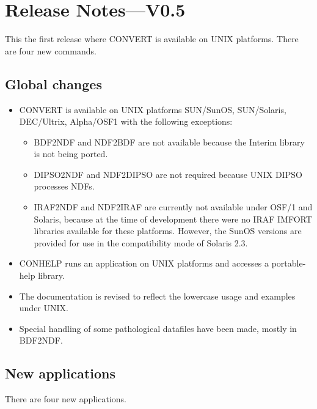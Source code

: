 \section{Release Notes---V0.5}

This the first release where {\footnotesize CONVERT} is available on
UNIX platforms.  There are four new commands. 

\subsection{Global changes}
\begin{itemize}
  \item  {\footnotesize CONVERT} is available on UNIX platforms
         SUN/SunOS, SUN/Solaris, DEC/Ultrix, Alpha/OSF1 with the
         following exceptions:

  \begin{itemize}

     \item BDF2NDF and NDF2BDF are not available because the Interim
           library is not being ported.

     \item DIPSO2NDF and NDF2DIPSO are not required because UNIX DIPSO
           processes NDFs.

     \item IRAF2NDF and NDF2IRAF are currently not available under OSF/1
           and Solaris, because at the time of development there were no
           IRAF IMFORT libraries available for these platforms.  However,
           the SunOS versions are provided for use in the compatibility
           mode of Solaris 2.3.
  \end{itemize}

  \item  CONHELP runs an application on UNIX platforms and accesses a
         portable-help library.

  \item  The documentation is revised to reflect the lowercase usage and
         examples under UNIX.

  \item  Special handling of some pathological datafiles have been made,
         mostly in BDF2NDF.
\end{itemize}

\subsection{New applications}
There are four new applications.

